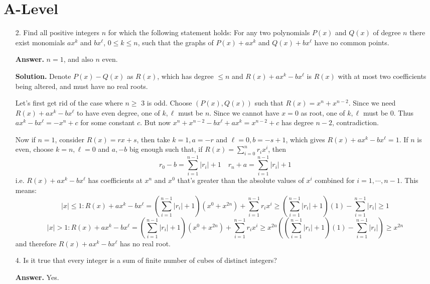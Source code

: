 \documentclass[11pt,a4paper]{article}
\begin{document}
\section*{A-Level}
\begin{enumerate}
  \item[2.]
  Find all positive integers $n$ for which the following statement holds:
  For any two polynomials $P(x)$ and $Q(x)$ of degree $n$ there exist monomials $ax^k$ and 
  $bx^\ell$, $0 \le  k  \le n$, such that the graphs of $P(x) + ax^k$ and $Q(x) + bx^{\ell}$ have no common points.
  
  \textbf{Answer.} $n=1$, and also $n$ even. 
  
  \textbf{Solution.} 
  Denote $P(x)-Q(x)$ as $R(x)$, which has degree $\le n$ 
  and $R(x)+ax^k-bx^{\ell}$ is $R(x)$ with at most two coefficients being altered, and must have no real roots. 
  
  Let's first get rid of the case where $n\ge$ 3 is odd. 
  Choose $(P(x), Q(x))$ such that $R(x)=x^n+x^{n-2}$. 
  Since we need $R(x)+ax^k-bx^{\ell}$ to have even degree, 
  one of $k, \ell$ must be $n$. 
  Since we cannot have $x=0$ as root, 
  one of $k, \ell$ must be 0. 
  Thus $ax^k-bx^{\ell}=-x^n+c$ for some constant $c$. 
  But now $x^n+x^{n-2}-bx^{\ell}+ax^{k}=x^{n-2}+c$ has degree $n-2$, contradiction. 
  
  Now if $n=1$, consider $R(x)=rx+s$, then take $k=1, a=-r$ and $\ell=0, b=-s+1$, 
  which gives $R(x)+ax^k-bx^{\ell}=1$. 
  If $n$ is even, choose $k=n, \ell=0$ and $a, -b$ big enough such that, 
  if $R(x)=\sum_{i=0}^n r_ix^i$, then 
  \[
  r_0-b = \sum_{i=1}^{n-1}|r_i|+1\quad 
  r_n+a=\sum_{i=1}^{n-1} |r_i|+1
  \]
  i.e. $R(x)+ax^k-bx^{\ell}$ has coefficients  at $x^n$ and $x^0$ that's greater than 
  the absolute values of $x^i$ combined for $i=1, \cdots, n-1$. 
  This means: 
  \[
  |x|\le 1: 
  R(x)+ax^k-bx^{\ell}
  =(\sum_{i=1}^{n-1}|r_i|+1)(x^0+x^{2n}) + \sum_{i=1}^{n-1} r_ix^i
  \ge (\sum_{i=1}^{n-1}|r_i|+1)(1) - \sum_{i=1}^{n-1} |r_i|
  \ge 1
  \]
  \[
  |x|>1: 
  R(x)+ax^k-bx^{\ell}
  =(\sum_{i=1}^{n-1}|r_i|+1)(x^0+x^{2n}) + \sum_{i=1}^{n-1} r_ix^i
  \ge x^{2n}\left((\sum_{i=1}^{n-1}|r_i|+1)(1) - \sum_{i=1}^{n-1} |r_i|\right)
  \ge x^{2n}
  \]
  and therefore $R(x)+ax^k-bx^{\ell}$ has no real root. 
  
  \item[4.]
  Is it true that every integer is a sum of finite number of cubes of distinct integers?
  
  \textbf{Answer.} Yes. 
  

\end{enumerate}
\end{document}
